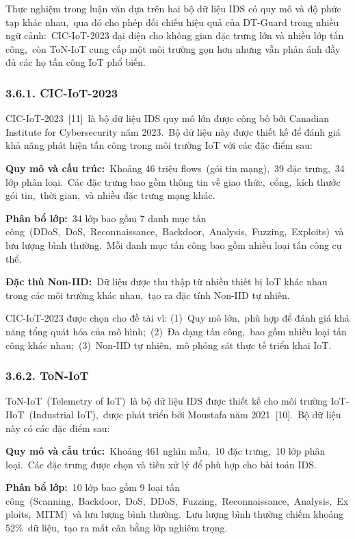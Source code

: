 Thực nghiệm trong luận văn dựa trên hai bộ dữ liệu IDS có quy mô và độ phức tạp khác nhau,~qua đó cho phép đối chiếu hiệu quả của DT-Guard trong nhiều ngữ cảnh:~CIC-IoT-2023 đại diện cho không gian đặc trưng lớn và nhiều lớp tấn công,~còn ToN-IoT cung cấp một môi trường gọn hơn nhưng vẫn phản ánh đầy đủ các họ tấn công IoT phổ biến.

\subsubsection{3.6.1. CIC-IoT-2023}\label{cic-iot-2023}

CIC-IoT-2023~{[}11{]}~là bộ dữ liệu IDS quy mô lớn được công bố bởi Canadian Institute for Cybersecurity năm 2023.~Bộ dữ liệu này được thiết kế để đánh giá khả năng phát hiện tấn công trong môi trường IoT với các đặc điểm sau:

\textbf{Quy mô và cấu trúc:}~Khoảng 46 triệu flows~(gói tin mạng),~39 đặc trưng,~34 lớp phân loại.~Các đặc trưng bao gồm thông tin về giao thức,~cổng,~kích thước gói tin,~thời gian,~và nhiều đặc trưng mạng khác.

\textbf{Phân bổ lớp:}~34 lớp bao gồm 7 danh mục tấn công~(DDoS,~DoS,~Reconnaissance,~Backdoor,~Analysis,~Fuzzing,~Exploits)~và lưu lượng bình thường.~Mỗi danh mục tấn công bao gồm nhiều loại tấn công cụ thể.

\textbf{Đặc thù Non-IID:}~Dữ liệu được thu thập từ nhiều thiết bị IoT khác nhau trong các môi trường khác nhau,~tạo ra đặc tính Non-IID tự nhiên.

CIC-IoT-2023 được chọn cho đề tài vì: (1)~Quy mô lớn,~phù hợp để đánh giá khả năng tổng quát hóa của mô hình;~(2)~Đa dạng tấn công,~bao gồm nhiều loại tấn công khác nhau;~(3)~Non-IID tự nhiên,~mô phỏng sát thực tế triển khai IoT.

\subsubsection{3.6.2. ToN-IoT}\label{ton-iot}

ToN-IoT~(Telemetry of IoT)~là bộ dữ liệu IDS được thiết kế cho môi trường IoT-IIoT~(Industrial IoT),~được phát triển bởi Moustafa năm 2021~{[}10{]}.~Bộ dữ liệu này có các đặc điểm sau:

\textbf{Quy mô và cấu trúc:}~Khoảng 461 nghìn mẫu,~10 đặc trưng,~10 lớp phân loại.~Các đặc trưng được chọn và tiền xử lý để phù hợp cho bài toán IDS.

\textbf{Phân bổ lớp:}~10 lớp bao gồm 9 loại tấn công~(Scanning,~Backdoor,~DoS,~DDoS,~Fuzzing,~Reconnaissance,~Analysis,~Exploits,~MITM)~và lưu lượng bình thường.~Lưu lượng bình thường chiếm khoảng 52\%~dữ liệu,~tạo ra mất cân bằng lớp nghiêm trọng.

